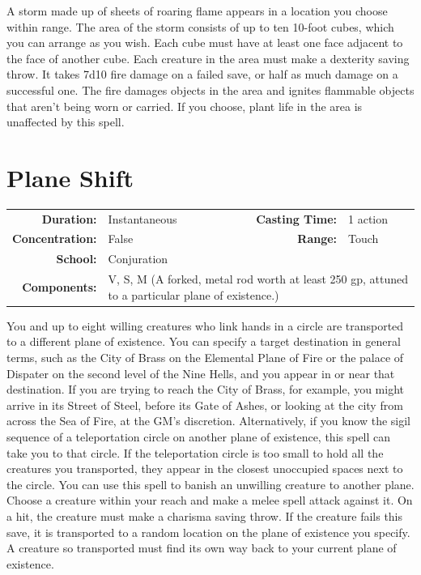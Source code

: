 \documentclass[12pt,showtrims]{memoir}
\begin{document}
\vspace{1\baselineskip}\noindent A storm made up of sheets of roaring flame appears in a location you choose within range. The area of the storm consists of up to ten 10-foot cubes, which you can arrange as you wish. Each cube must have at least one face adjacent to the face of another cube. Each creature in the area must make a dexterity saving throw. It takes 7d10 fire damage on a failed save, or half as much damage on a successful one. The fire damages objects in the area and ignites flammable objects that aren't being worn or carried. If you choose, plant life in the area is unaffected by this spell.

\newpage
\section*{Plane Shift}

{
\small\centering\vspace{-6pt}
\begin{tabular}{rlrl}
\toprule

\textbf{Duration:} & Instantaneous &
\textbf{Casting Time:} & 1 action \\
\textbf{Concentration:} & False &
\textbf{Range:} & Touch \\
\textbf{School:} & Conjuration \\
\textbf{Components:} & \multicolumn{3}{p{0.7\textwidth}}{V, S, M (A forked, metal rod worth at least 250 gp, attuned to a particular plane of existence.)}\\

\bottomrule
\end{tabular}
}

\vspace{1\baselineskip}\noindent You and up to eight willing creatures who link hands in a circle are transported to a different plane of existence. You can specify a target destination in general terms, such as the City of Brass on the Elemental Plane of Fire or the palace of Dispater on the second level of the Nine Hells, and you appear in or near that destination. If you are trying to reach the City of Brass, for example, you might arrive in its Street of Steel, before its Gate of Ashes, or looking at the city from across the Sea of Fire, at the GM's discretion. Alternatively, if you know the sigil sequence of a teleportation circle on another plane of existence, this spell can take you to that circle. If the teleportation circle is too small to hold all the creatures you transported, they appear in the closest unoccupied spaces next to the circle. You can use this spell to banish an unwilling creature to another plane. Choose a creature within your reach and make a melee spell attack against it. On a hit, the creature must make a charisma saving throw. If the creature fails this save, it is transported to a random location on the plane of existence you specify. A creature so transported must find its own way back to your current plane of existence.
\end{document}
